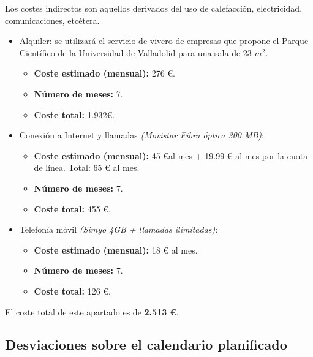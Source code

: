 \documentclass[twoside]{report}
\begin{document}
Los costes indirectos son aquellos derivados del uso de calefacción, electricidad, comunicaciones, etcétera.

\begin{itemize}

\item Alquiler: se utilizará el servicio de vivero de empresas que propone el \cite{pcuva} Parque Científico de la Universidad de Valladolid para una sala de 23 ${m}^{2}$.
	\begin{itemize}
		\item \textbf{Coste estimado (mensual): } 276 \euro.
		\item \textbf{Número de meses:} 7.
		\item \textbf{Coste total:} 1.932\euro.
	\end{itemize}
	
\item Conexión a Internet y llamadas \textit{(Movistar Fibra óptica 300 MB)}:
	\begin{itemize}
		\item \textbf{Coste estimado (mensual):} 45 \euro \hspace{0.1cm}al mes + 19.99 \euro \hspace{0.1cm} al mes por la cuota de línea. Total: 65 \euro \hspace{0.1cm} al mes.
		\item \textbf{Número de meses:} 7.
		\item \textbf{Coste total:} 455 \euro.
	\end{itemize}
		
\item Telefonía móvil \textit{(Simyo 4GB + llamadas ilimitadas)}:
	\begin{itemize}
		\item \textbf{Coste estimado (mensual):} 18 \euro \hspace{0.1cm} al mes.
		\item \textbf{Número de meses:} 7.
		\item \textbf{Coste total:} 126 \euro.
	\end{itemize}

\end{itemize}

El coste total de este apartado es de \textbf{2.513 \euro}.

\subsection{Desviaciones sobre el calendario planificado}
\end{document}
